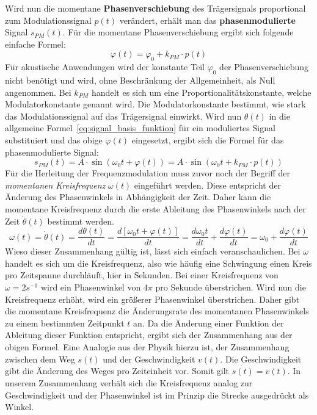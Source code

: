 Wird nun die momentane \textbf{Phasenverschiebung} des Trägersignals proportional zum Modulationssignal \(p(t)\) verändert, erhält man das \textbf{phasenmodulierte} Signal \(s_{PM}(t)\). \cite[S. 209]{lathi}
Für die momentane Phasenverschiebung ergibt sich folgende einfache Formel:
\begin{equation}
\varphi(t)=\varphi_0+k_{PM}\cdot p(t)
\label{eq:varphi_t}
\end{equation}
Für akustische Anwendungen wird der konstante Teil \(\varphi_0\) der Phasenverschiebung nicht benötigt und wird, ohne Beschränkung der Allgemeinheit, als Null angenommen.
Bei \(k_{PM}\) handelt es sich um eine Proportionalitätskonstante, welche Modulatorkonstante genannt wird. Die Modulatorkonstante bestimmt, wie stark das Modulationssignal auf das Trägersignal einwirkt. Wird nun \(\theta(t)\) in die allgemeine Formel~\ref{eq:signal_basis_funktion} für ein moduliertes Signal substituiert und das obige \(\varphi(t)\) eingesetzt, ergibt sich die Formel für das phasenmodulierte Signal:
\begin{equation}
s_{PM}(t)=A\cdot\sin(\omega_0t + \varphi(t))=A\cdot\sin(\omega_0t+k_{PM}\cdot p(t))
\label{eq:s_pm}
\end{equation}
Für die Herleitung der Frequenzmodulation muss zuvor noch der Begriff der \textit{momentanen Kreisfrequenz} \(\omega(t)\) eingeführt werden.
Diese entspricht der Änderung des Phasenwinkels in Abhängigkeit der Zeit. Daher kann die momentane Kreisfrequenz durch die erste Ableitung des Phasenwinkels nach der Zeit $\dot \theta(t)$ bestimmt werden. \cite[S. 209]{lathi}
\begin{equation}
\omega(t)=\dot \theta(t)=\frac{d\theta(t)}{dt}=\frac{d[\omega_0t+\varphi(t)]}{dt}=\frac{d\omega_0t}{dt}+\frac{d\varphi(t)}{dt}=\omega_0+\frac{d\varphi(t)}{dt}
\label{eq:omega_m_herleitung}
\end{equation}
Wieso dieser Zusammenhang gültig ist, lässt sich einfach veranschaulichen. Bei \(\omega\) handelt es sich um die Kreisfrequenz, also wie häufig eine Schwingung einen Kreis pro Zeitspanne durchläuft, hier in Sekunden. Bei einer Kreisfrequenz von \(\omega=2 s^{-1}\) wird ein Phasenwinkel von \(4\pi\) pro Sekunde überstrichen. Wird nun die Kreisfrequenz erhöht, wird ein größerer Phasenwinkel überstrichen. Daher gibt die momentane Kreisfrequenz die Änderungsrate des momentanen Phasenwinkels zu einem bestimmten Zeitpunkt \(t\) an. Da die Änderung einer Funktion der Ableitung dieser Funktion entspricht, ergibt sich der Zusammenhang aus der obigen Formel. 
Eine Analogie aus der Physik hierzu ist, der Zusammenhang zwischen dem Weg \(s(t)\) und der Geschwindigkeit \(v(t)\). Die Geschwindigkeit gibt die Änderung des Weges pro Zeiteinheit vor. Somit gilt \(\dot{s(t)}=v(t)\). In unserem Zusammenhang verhält sich die Kreisfrequenz analog zur Geschwindigkeit und der Phasenwinkel ist im Prinzip die Strecke ausgedrückt als Winkel.

